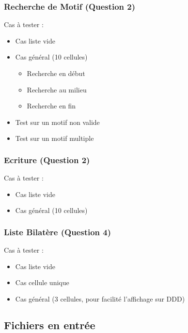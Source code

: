 \documentclass{report}
\newenvironment{myindentpar}[1]%
    {\begin{list}{}%
             {\setlength{\leftmargin}{#1}}%
             \item[]%
     }
     {\end{list}}
\begin{document}
\subsubsection{Recherche de Motif (Question 2)}
Cas à tester :
\begin{myindentpar}{2cm}
\begin{itemize}
    \item Cas liste vide
    \item Cas général (10 cellules)
    \begin{itemize}
        \item Recherche en début
        \item Recherche au milieu
        \item Recherche en fin
    \end{itemize}
    \item Test sur un motif non valide
    \item Test sur un motif multiple
\end{itemize}
\end{myindentpar}

\subsubsection{Ecriture (Question 2)}
Cas à tester :
\begin{myindentpar}{2cm}
\begin{itemize}
    \item Cas liste vide
    \item Cas général (10 cellules)
\end{itemize}
\end{myindentpar}

\subsubsection{Liste Bilatère (Question 4)}
Cas à tester :
\begin{myindentpar}{2cm}
\begin{itemize}
    \item Cas liste vide
    \item Cas cellule unique
    \item Cas général (3 cellules, pour facilité l'affichage sur DDD)
\end{itemize}
\end{myindentpar}

\newpage
\subsection{Fichiers en entrée}
\end{document}
